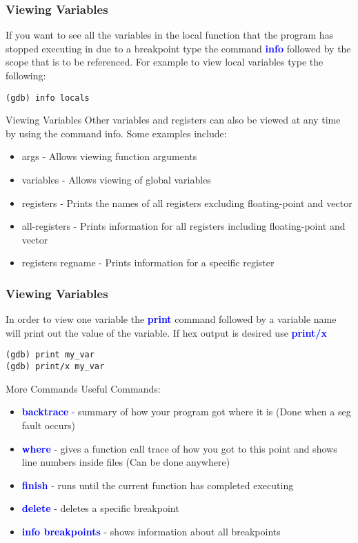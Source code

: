 \documentclass[11pt]{beamer}
\begin{document}
\begin{frame}[fragile]
\frametitle{Viewing Variables}
If you want to see all the variables in the local function that the program has stopped executing in due to a breakpoint type the command \textbf{\textcolor{blue}{info}} followed by the scope that is to be referenced. 
\break
\break
For example to view local variables type the following:
\begin{lstlisting}[style=BashInputStyle]
(gdb) info locals
\end{lstlisting}
\end{frame}

\begin{frame}{Viewing Variables}
Other variables and registers can also be viewed at any time by using the command info. Some examples include:
\begin{itemize}
\item args - Allows viewing function arguments
\item variables - Allows viewing of global variables
\item registers - Prints the names of all registers excluding floating-point and vector
\item all-registers - Prints information for all registers including floating-point and vector
\item registers regname - Prints information for a specific register
\end{itemize}
\end{frame}

\begin{frame}[fragile]
\frametitle{Viewing Variables}
In order to view one variable the \textbf{\textcolor{blue}{print}} command followed by a variable name will print out the value of the variable. If hex output is desired use \textbf{\textcolor{blue}{print/x}}
\begin{lstlisting}[style=BashInputStyle]
(gdb) print my_var
(gdb) print/x my_var
\end{lstlisting}
\end{frame}

\begin{frame}{More Commands}
Useful Commands:
\begin{itemize}
\item \textbf{\textcolor{blue}{backtrace}} - summary of how your program got where it is (Done when a seg fault occurs)
\item \textbf{\textcolor{blue}{where}} - gives a function call trace of how you got to this point and shows line numbers inside files (Can be done anywhere)
\item \textbf{\textcolor{blue}{finish}} - runs until the current function has completed executing
\item \textbf{\textcolor{blue}{delete}} - deletes a specific breakpoint
\item \textbf{\textcolor{blue}{info breakpoints}} - shows information about all breakpoints
\end{itemize}
\end{frame}
\end{document}
